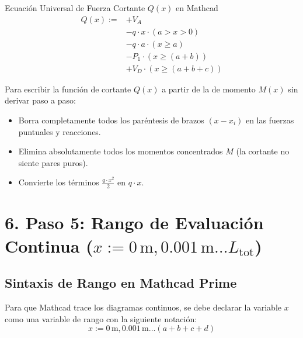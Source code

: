 \documentclass[10pt,a4paper]{article}
\begin{document}
\begin{mathcadbox}{Ecuación Universal de Fuerza Cortante $Q(x)$ en Mathcad}
\begin{align*}
    Q(x) := &+ V_A \\
            &- q \cdot x \cdot (a > x > 0) \\
            &- q \cdot a \cdot (x \ge a) \\
            &- P_1 \cdot (x \ge (a + b)) \\
            &+ V_D \cdot (x \ge (a + b + c))
\end{align*}
\end{mathcadbox}

\begin{tipbox}
Para escribir la función de cortante $Q(x)$ a partir de la de momento $M(x)$ sin derivar paso a paso:
\begin{itemize}[leftmargin=*,itemsep=1pt]
    \item Borra completamente todos los paréntesis de brazos $(x - x_i)$ en las fuerzas puntuales y reacciones.
    \item Elimina absolutamente todos los momentos concentrados $M$ (la cortante no siente pares puros).
    \item Convierte los términos $\frac{q \cdot x^2}{2}$ en $q \cdot x$.
\end{itemize}
\end{tipbox}

\vspace{6pt}

\section{\color{NavyBlue}6. Paso 5: Rango de Evaluación Continua ($x := 0\,\text{m}, 0.001\,\text{m} \dots L_{\text{tot}}$)}

\subsection{Sintaxis de Rango en Mathcad Prime}
Para que Mathcad trace los diagramas continuos, se debe declarar la variable $x$ como una variable de rango con la siguiente notación:
\begin{equation*}
    x := 0\,\text{m}, 0.001\,\text{m} \dots (a + b + c + d)
\end{equation*}
\end{document}
